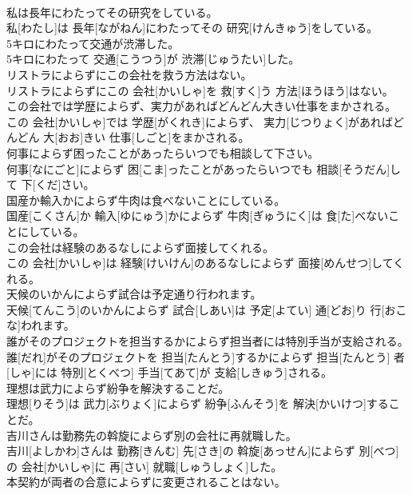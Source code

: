 \documentclass[8pt]{extreport}
\begin{document}
\begin{CJK}{UTF8}{min}
\\	私は長年にわたってその研究をしている。	
\\	私[わたし]は 長年[ながねん]にわたってその 研究[けんきゅう]をしている。
\\	5キロにわたって交通が渋滞した。	
\\	5キロにわたって 交通[こうつう]が 渋滞[じゅうたい]した。
\\	リストラによらずにこの会社を救う方法はない。	
\\	リストラによらずにこの 会社[かいしゃ]を 救[すく]う 方法[ほうほう]はない。
\\	この会社では学歴によらず、実力があればどんどん大きい仕事をまかされる。	
\\	この 会社[かいしゃ]では 学歴[がくれき]によらず、 実力[じつりょく]があればどんどん 大[おお]きい 仕事[しごと]をまかされる。
\\	何事によらず困ったことがあったらいつでも相談して下さい。	
\\	何事[なにごと]によらず 困[こま]ったことがあったらいつでも 相談[そうだん]して 下[くだ]さい。
\\	国産か輸入かによらず牛肉は食べないことにしている。	
\\	国産[こくさん]か 輸入[ゆにゅう]かによらず 牛肉[ぎゅうにく]は 食[た]べないことにしている。
\\	この会社は経験のあるなしによらず面接してくれる。	
\\	この 会社[かいしゃ]は 経験[けいけん]のあるなしによらず 面接[めんせつ]してくれる。
\\	天候のいかんによらず試合は予定通り行われます。	
\\	天候[てんこう]のいかんによらず 試合[しあい]は 予定[よてい] 通[どお]り 行[おこな]われます。
\\	誰がそのプロジェクトを担当するかによらず担当者には特別手当が支給される。	
\\	誰[だれ]がそのプロジェクトを 担当[たんとう]するかによらず 担当[たんとう] 者[しゃ]には 特別[とくべつ] 手当[てあて]が 支給[しきゅう]される。
\\	理想は武力によらず紛争を解決することだ。	
\\	理想[りそう]は 武力[ぶりょく]によらず 紛争[ふんそう]を 解決[かいけつ]することだ。
\\	吉川さんは勤務先の斡旋によらず別の会社に再就職した。	
\\	吉川[よしかわ]さんは 勤務[きんむ] 先[さき]の 斡旋[あっせん]によらず 別[べつ]の 会社[かいしゃ]に 再[さい] 就職[しゅうしょく]した。
\\	本契約が両者の合意によらずに変更されることはない。	

\end{CJK}
\end{document}
